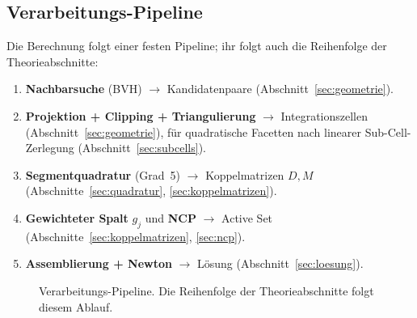 \documentclass[a4paper,11pt]{article}
\def\bm#1{#1}%
\def\tilde#1{#1}%
\begin{document}
\subsection{Verarbeitungs-Pipeline}
Die Berechnung folgt einer festen Pipeline; ihr folgt auch die Reihenfolge der
Theorieabschnitte:
\begin{enumerate}\itemsep2pt
  \item \textbf{Nachbarsuche} (BVH) $\to$ Kandidatenpaare (Abschnitt~\ref{sec:geometrie}).
  \item \textbf{Projektion + Clipping + Triangulierung} $\to$ Integrationszellen
        (Abschnitt~\ref{sec:geometrie}), für quadratische Facetten nach linearer Sub-Cell-Zerlegung
        (Abschnitt~\ref{sec:subcells}).
  \item \textbf{Segmentquadratur} (Grad~5) $\to$ Koppelmatrizen $\bm D,\bm M$
        (Abschnitte~\ref{sec:quadratur}, \ref{sec:koppelmatrizen}).
  \item \textbf{Gewichteter Spalt} $\tilde g_j$ und \textbf{NCP} $\to$ Active Set
        (Abschnitte~\ref{sec:koppelmatrizen}, \ref{sec:ncp}).
  \item \textbf{Assemblierung + Newton} $\to$ Lösung (Abschnitt~\ref{sec:loesung}).
\end{enumerate}

\begin{figure}[htbp]
\centering
{}
\caption[Verarbeitungs-Pipeline des Mortar-Kontakts]{Verarbeitungs-Pipeline. Die Reihenfolge der
Theorieabschnitte folgt diesem Ablauf.}
\label{fig:pipeline}
\end{figure}
\end{document}
